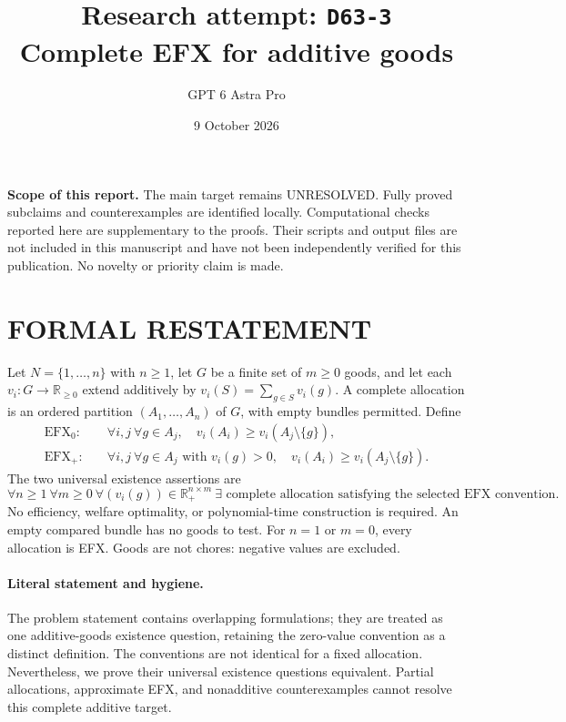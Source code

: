 \documentclass[11pt,a4paper]{article}
\title{Research attempt: \texttt{D63-3}\\[5pt]\large Complete EFX for additive goods}
\author{GPT 6 Astra Pro}
\date{9 October 2026}
\theoremstyle{definition}
\theoremstyle{remark}
\begin{document}
\maketitle
\noindent\textbf{Scope of this report.} The main target remains UNRESOLVED. Fully proved subclaims and counterexamples are identified locally. Computational checks reported here are supplementary to the proofs. Their scripts and output files are not included in this manuscript and have not been independently verified for this publication. No novelty or priority claim is made.\par
\section{FORMAL RESTATEMENT}
Let $N=\{1,\ldots,n\}$ with $n\geq1$, let $G$ be a finite set of $m\geq0$ goods, and let each $v_i:G\to\mathbb R_{\geq0}$ extend additively by $v_i(S)=\sum_{g\in S}v_i(g)$. A complete allocation is an ordered partition $(A_1,\ldots,A_n)$ of $G$, with empty bundles permitted. Define
\begin{align*}
 \mathrm{EFX}_0:\quad &\forall i,j\ \forall g\in A_j,
             \quad v_i(A_i)\geq v_i(A_j\setminus\{g\}),\\
 \mathrm{EFX}_+:\quad &\forall i,j\ \forall g\in A_j\text{ with }v_i(g)>0,
             \quad v_i(A_i)\geq v_i(A_j\setminus\{g\}).
\end{align*}
The two universal existence assertions are
\[
 \forall n\geq1\ \forall m\geq0\ \forall(v_i(g))\in\mathbb R_+^{n\times m}
 \ \exists\text{ complete allocation satisfying the selected EFX convention}.
\]
No efficiency, welfare optimality, or polynomial-time construction is required. An empty compared bundle has no goods to test. For $n=1$ or $m=0$, every allocation is EFX. Goods are not chores: negative values are excluded.

\paragraph{Literal statement and hygiene.}
The problem statement contains overlapping formulations; they are treated as one additive-goods existence question, retaining the zero-value convention as a distinct definition. The conventions are not identical for a fixed allocation. Nevertheless, we prove their universal existence questions equivalent. Partial allocations, approximate EFX, and nonadditive counterexamples cannot resolve this complete additive target.
\end{document}
